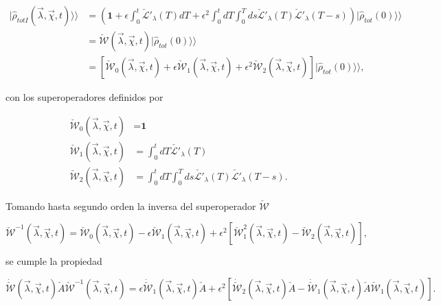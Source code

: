 \begin{appendixs}
\begin{align*}
    |\hat{\rho}_{totI}(\vec{\lambda},\vec{\chi},t)\rangle \rangle  & = \left( \textbf{1} + \epsilon \int_{0}^{t}\check{\mathcal{L}}'_{\lambda}(T)dT + \epsilon^{2}\int_{0}^{t}dT\int_{0}^{T}ds \check{\mathcal{L}}'_{\lambda}(T)\check{\mathcal{L}}'_{\lambda}(T-s) \right)|\hat{\rho}_{tot}(0)\rangle \rangle  \\
    & = \check{\mathcal{W}}(\vec{\lambda},\vec{\chi},t)|\hat{\rho}_{tot}(0)\rangle \rangle \\
    & =  [\check{\mathcal{W}}_{0}(\vec{\lambda},\vec{\chi},t) + \epsilon \check{\mathcal{W}}_{1}(\vec{\lambda},\vec{\chi},t) + \epsilon^{2}\check{\mathcal{W}}_{2}(\vec{\lambda},\vec{\chi},t)] |\hat{\rho}_{tot}(0)\rangle \rangle,
\end{align*}

con los superoperadores definidos por 

\begin{align*}
    \check{\mathcal{W}}_{0}(\vec{\lambda},\vec{\chi},t) &  = \textbf{1}\\
    \check{\mathcal{W}}_{1}(\vec{\lambda},\vec{\chi},t) & = \int_{0}^{t}dT \check{\mathcal{L}'}_{\lambda}(T) \\
    \check{\mathcal{W}}_{2}(\vec{\lambda},\vec{\chi},t) & = \int_{0}^{t}dT \int_{0}^{T}ds \check{\mathcal{L}'}_{\lambda}(T)\check{\mathcal{L}'}_{\lambda}(T-s).
\end{align*}

Tomando hasta segundo orden la inversa del superoperador $\check{\mathcal{W}}$

\begin{equation}
    \check{\mathcal{W}}^{-1}(\vec{\lambda},\vec{\chi},t) =  \check{\mathcal{W}}_{0}(\vec{\lambda},\vec{\chi},t) - \epsilon  \check{\mathcal{W}}_{1}(\vec{\lambda},\vec{\chi},t) +  \epsilon^{2}[\check{\mathcal{W}}^{2}_{1}(\vec{\lambda},\vec{\chi},t) -  \check{\mathcal{W}}_{2}(\vec{\lambda},\vec{\chi},t) ],
\label{apendix2inverseW}
\end{equation}

se cumple la propiedad

\begin{equation}
    \dot{\check{\mathcal{W}}}(\vec{\lambda},\vec{\chi},t)\check{A}\check{\mathcal{W}}^{-1}(\vec{\lambda},\vec{\chi},t) = \epsilon \dot{\check{\mathcal{W}}}_{1}(\vec{\lambda},\vec{\chi},t)\check{A} + \epsilon^{2}[\dot{\check{\mathcal{W}}}_{2}(\vec{\lambda},\vec{\chi},t)\check{A} - \dot{\check{\mathcal{W}}}_{1}(\vec{\lambda},\vec{\chi},t)\check{A}\check{\mathcal{W}}_{1}(\vec{\lambda},\vec{\chi},t) ].
    \label{apendix2Wproperty}
\end{equation}


\end{appendixs}

